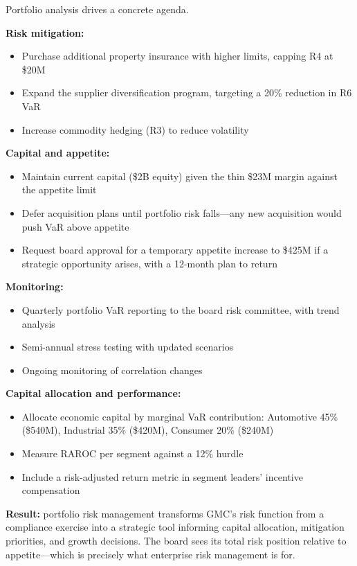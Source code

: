\documentclass[11pt,openany]{book}
\providecommand{\tightlist}{\setlength{\itemsep}{0pt}\setlength{\parskip}{0pt}}
\begin{document}
Portfolio analysis drives a concrete agenda.

\textbf{Risk mitigation:}
\begin{itemize}\tightlist
  \item Purchase additional property insurance with higher limits, capping R4
        at \$20M
  \item Expand the supplier diversification program, targeting a 20\%
        reduction in R6 VaR
  \item Increase commodity hedging (R3) to reduce volatility
\end{itemize}

\textbf{Capital and appetite:}
\begin{itemize}\tightlist
  \item Maintain current capital (\$2B equity) given the thin \$23M margin
        against the appetite limit
  \item Defer acquisition plans until portfolio risk falls---any new
        acquisition would push VaR above appetite
  \item Request board approval for a temporary appetite increase to \$425M if
        a strategic opportunity arises, with a 12-month plan to return
\end{itemize}

\textbf{Monitoring:}
\begin{itemize}\tightlist
  \item Quarterly portfolio VaR reporting to the board risk committee, with
        trend analysis
  \item Semi-annual stress testing with updated scenarios
  \item Ongoing monitoring of correlation changes
\end{itemize}

\textbf{Capital allocation and performance:}
\begin{itemize}\tightlist
  \item Allocate economic capital by marginal VaR contribution: Automotive
        45\% (\$540M), Industrial 35\% (\$420M), Consumer 20\% (\$240M)
  \item Measure RAROC per segment against a 12\% hurdle
  \item Include a risk-adjusted return metric in segment leaders' incentive
        compensation
\end{itemize}

\textbf{Result:} portfolio risk management transforms GMC's risk function from
a compliance exercise into a strategic tool informing capital allocation,
mitigation priorities, and growth decisions. The board sees its total risk
position relative to appetite---which is precisely what enterprise risk
management is for.
\end{document}
